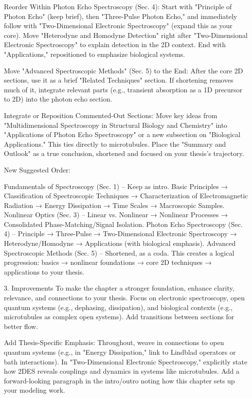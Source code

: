 {Reorder Within Photon Echo Spectroscopy (Sec. 4): Start with "Principle of Photon Echo" (keep brief), then "Three-Pulse Photon Echo," and immediately follow with "Two-Dimensional Electronic Spectroscopy" (expand this as your core). Move "Heterodyne and Homodyne Detection" right after "Two-Dimensional Electronic Spectroscopy" to explain detection in the 2D context. End with "Applications," repositioned to emphasize biological systems.

Move "Advanced Spectroscopic Methods" (Sec. 5) to the End: After the core 2D sections, use it as a brief "Related Techniques" section. If shortening removes much of it, integrate relevant parts (e.g., transient absorption as a 1D precursor to 2D) into the photon echo section.

Integrate or Reposition Commented-Out Sections: Move key ideas from "Multidimensional Spectroscopy in Structural Biology and Chemistry" into "Applications of Photon Echo Spectroscopy" or a new subsection on "Biological Applications." This ties directly to microtubules. Place the "Summary and Outlook" as a true conclusion, shortened and focused on your thesis's trajectory.

New Suggested Order:

Fundamentals of Spectroscopy (Sec. 1) – Keep as intro.
Basic Principles → Classification of Spectroscopic Techniques → Characterization of Electromagnetic Radiation → Energy Dissipation → Time Scales → Macroscopic Samples.
Nonlinear Optics (Sec. 3) – Linear vs. Nonlinear → Nonlinear Processes → Consolidated Phase-Matching/Signal Isolation.
Photon Echo Spectroscopy (Sec. 4) – Principle → Three-Pulse → Two-Dimensional Electronic Spectroscopy → Heterodyne/Homodyne → Applications (with biological emphasis).
Advanced Spectroscopic Methods (Sec. 5) – Shortened, as a coda.
This creates a logical progression: basics → nonlinear foundations → core 2D techniques → applications to your thesis.

3. Improvements
To make the chapter a stronger foundation, enhance clarity, relevance, and connections to your thesis. Focus on electronic spectroscopy, open quantum systems (e.g., dephasing, dissipation), and biological contexts (e.g., microtubules as complex open systems). Add transitions between sections for better flow.

Add Thesis-Specific Emphasis: Throughout, weave in connections to open quantum systems (e.g., in "Energy Dissipation," link to Lindblad operators or bath interactions). In "Two-Dimensional Electronic Spectroscopy," explicitly state how 2DES reveals couplings and dynamics in systems like microtubules. Add a forward-looking paragraph in the intro/outro noting how this chapter sets up your modeling work.

}
